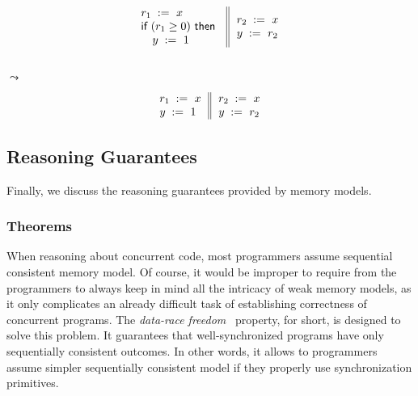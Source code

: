 {\footnotesize
\begin{minipage}{0.45\linewidth}
\begin{equation*}
\inarrII{
   \readInst{}{r_1}{x}             \\
   \kw{if} (r_1 \geq 0) ~\kw{then} \\
   \quad\writeInst{}{y}{1}         \\
}{
  \readInst{}{r_2}{x}               \\
  \writeInst{}{y}{r_2}              \\
}
\end{equation*}
\end{minipage}\hfill%
\begin{minipage}{0.05\linewidth}
\Large~\\ $\leadsto$
\end{minipage}\hfill%
\begin{minipage}{0.4\linewidth}
\begin{equation*}
\inarrII{
   \readInst{}{r_1}{x}             \\
   \writeInst{}{y}{1}              \\
}{
  \readInst{}{r_2}{x}               \\
  \writeInst{}{y}{r_2}              \\
}
\end{equation*}
\end{minipage}
}

\subsection{Reasoning Guarantees}


Finally, we discuss the reasoning guarantees provided by memory models. 

\subsubsection{\DRF Theorems}
\label{sec:background:drf}

When reasoning about concurrent code, most programmers 
assume sequential consistent memory model.
Of course, it would be improper to require from 
the programmers to always keep in mind 
all the intricacy of weak memory models,
as it only complicates an already difficult task
of establishing correctness of concurrent programs. 
The \emph{data-race freedom}~\cite{Manson-al:POPL05} property, 
\DRF for short, is designed to solve this problem. 
It guarantees that well-synchronized programs 
have only sequentially consistent outcomes. 
In other words, it allows to programmers assume 
simpler sequentially consistent model 
if they properly use synchronization primitives.

